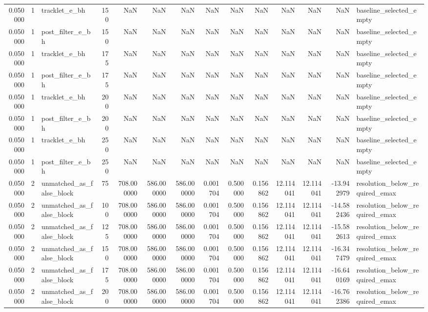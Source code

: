 \begin{tabular}{rrlrrrrrrrrrrl}
0.050000 & 1 & tracklet_e_bh & 150 & NaN & NaN & NaN & NaN & NaN & NaN & NaN & NaN & NaN & baseline_selected_empty \\
0.050000 & 1 & post_filter_e_bh & 150 & NaN & NaN & NaN & NaN & NaN & NaN & NaN & NaN & NaN & baseline_selected_empty \\
0.050000 & 1 & tracklet_e_bh & 175 & NaN & NaN & NaN & NaN & NaN & NaN & NaN & NaN & NaN & baseline_selected_empty \\
0.050000 & 1 & post_filter_e_bh & 175 & NaN & NaN & NaN & NaN & NaN & NaN & NaN & NaN & NaN & baseline_selected_empty \\
0.050000 & 1 & tracklet_e_bh & 200 & NaN & NaN & NaN & NaN & NaN & NaN & NaN & NaN & NaN & baseline_selected_empty \\
0.050000 & 1 & post_filter_e_bh & 200 & NaN & NaN & NaN & NaN & NaN & NaN & NaN & NaN & NaN & baseline_selected_empty \\
0.050000 & 1 & tracklet_e_bh & 250 & NaN & NaN & NaN & NaN & NaN & NaN & NaN & NaN & NaN & baseline_selected_empty \\
0.050000 & 1 & post_filter_e_bh & 250 & NaN & NaN & NaN & NaN & NaN & NaN & NaN & NaN & NaN & baseline_selected_empty \\
0.050000 & 2 & unmatched_as_false_block & 75 & 708.000000 & 586.000000 & 586.000000 & 0.001704 & 0.500000 & 0.156862 & 12.114041 & 12.114041 & -13.942979 & resolution_below_required_emax \\
0.050000 & 2 & unmatched_as_false_block & 100 & 708.000000 & 586.000000 & 586.000000 & 0.001704 & 0.500000 & 0.156862 & 12.114041 & 12.114041 & -14.582436 & resolution_below_required_emax \\
0.050000 & 2 & unmatched_as_false_block & 125 & 708.000000 & 586.000000 & 586.000000 & 0.001704 & 0.500000 & 0.156862 & 12.114041 & 12.114041 & -15.582613 & resolution_below_required_emax \\
0.050000 & 2 & unmatched_as_false_block & 150 & 708.000000 & 586.000000 & 586.000000 & 0.001704 & 0.500000 & 0.156862 & 12.114041 & 12.114041 & -16.347479 & resolution_below_required_emax \\
0.050000 & 2 & unmatched_as_false_block & 175 & 708.000000 & 586.000000 & 586.000000 & 0.001704 & 0.500000 & 0.156862 & 12.114041 & 12.114041 & -16.640169 & resolution_below_required_emax \\
0.050000 & 2 & unmatched_as_false_block & 200 & 708.000000 & 586.000000 & 586.000000 & 0.001704 & 0.500000 & 0.156862 & 12.114041 & 12.114041 & -16.762386 & resolution_below_required_emax \\

\end{tabular}

